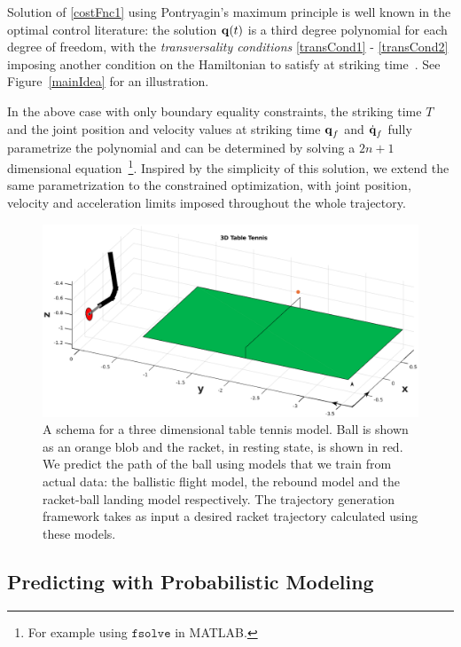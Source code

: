 Solution of \eqref{costFnc1} using Pontryagin's maximum principle is well known in the optimal control literature: the solution $\boldsymbol{\mathrm{q}}(t)$ is a third degree polynomial for each degree of freedom, with the \emph{transversality conditions} \eqref{transCond1} - \eqref{transCond2} imposing another condition on the Hamiltonian to satisfy at striking time~\cite{Schaettler12}. See Figure~\ref{mainIdea} for an illustration. %

In the above case with only boundary equality constraints, the striking time $T$ and the joint position and velocity values at striking time $\boldsymbol{\mathrm{q}}_f$ and $\dot{\boldsymbol{\mathrm{q}}}_f$ fully parametrize the polynomial and can be determined by solving a $2n+1$ dimensional equation~\footnote{For example using $\mathtt{fsolve}$ in MATLAB.}. Inspired by the simplicity of this solution, we extend the same parametrization to the constrained optimization, with joint position, velocity and acceleration limits imposed throughout the whole trajectory.

\begin{figure}[t!]
\centering
\includegraphics[scale=0.25]{tableTennis3D.eps}			
\caption{A schema for a three dimensional table tennis model. Ball is shown as an orange blob and the racket, in resting state, is shown in red. We predict the path of the ball using models that we train from actual data: the ballistic flight model, the rebound model and the racket-ball landing model respectively. The trajectory generation framework takes as input a desired racket trajectory calculated using these models.}
\label{models}
\end{figure}

\subsection{Predicting with Probabilistic Modeling}\label{sectionPredict}
 
